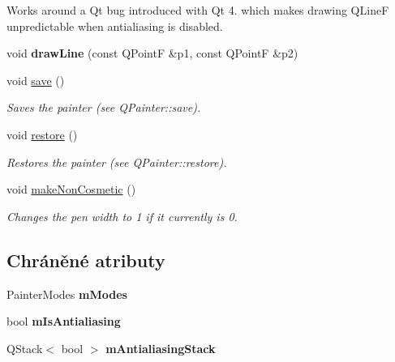 \begin{DoxyCompactItemize}
\begin{DoxyCompactList}
Works around a Qt bug introduced with Qt 4. which makes drawing Q\+Line\+F unpredictable when antialiasing is disabled. \end{DoxyCompactList}\item 
\hypertarget{classQCPPainter_ad1638db27929491b3f1beb74d6cbad5e}{}void {\bfseries draw\+Line} (const Q\+Point\+F \&p1, const Q\+Point\+F \&p2)\label{classQCPPainter_ad1638db27929491b3f1beb74d6cbad5e}

\item 
void \hyperlink{classQCPPainter_a8fd6821ee6fecbfa04444c9062912abd}{save} ()
\begin{DoxyCompactList}\small\item\em Saves the painter (see Q\+Painter\+::save). \end{DoxyCompactList}\item 
void \hyperlink{classQCPPainter_a64908e6298d5bbd83457dc987cc3a022}{restore} ()
\begin{DoxyCompactList}\small\item\em Restores the painter (see Q\+Painter\+::restore). \end{DoxyCompactList}\item 
void \hyperlink{classQCPPainter_a7e63fbcf47e35c6f2ecd11b8fef7c7d8}{make\+Non\+Cosmetic} ()
\begin{DoxyCompactList}\small\item\em Changes the pen width to 1 if it currently is 0. \end{DoxyCompactList}\end{DoxyCompactItemize}
\subsection*{Chráněné atributy}
\begin{DoxyCompactItemize}
\item 
\hypertarget{classQCPPainter_af5d1d6e5df0adbc7de5633250fb3396c}{}Painter\+Modes {\bfseries m\+Modes}\label{classQCPPainter_af5d1d6e5df0adbc7de5633250fb3396c}

\item 
\hypertarget{classQCPPainter_a7055085da176aee0f6b23298f1003d08}{}bool {\bfseries m\+Is\+Antialiasing}\label{classQCPPainter_a7055085da176aee0f6b23298f1003d08}

\item 
\hypertarget{classQCPPainter_a0189e641bbf7dc31ac15aef7b36501fa}{}Q\+Stack$<$ bool $>$ {\bfseries m\+Antialiasing\+Stack}\label{classQCPPainter_a0189e641bbf7dc31ac15aef7b36501fa}

\end{DoxyCompactItemize}


